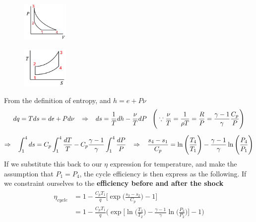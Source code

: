 \documentclass[a4paper,10pt]{article}
\begin{document}
\begin{multicols}{2}
    \begin{figure}[H]
        \centering
        \includegraphics[width=0.2\textwidth]{Figure/PV.png}
    \end{figure}
    \begin{figure}[H]
        \centering
        \includegraphics[width=0.2\textwidth]{Figure/TS.png}
    \end{figure}
\end{multicols}
\vspace*{-0.5cm}
From the definition of entropy, and $h = e+P\nu$
\begin{gather*}
    dq = Tds = de+Pd\nu\hspace*{0.3cm}\Rightarrow\hspace*{0.3cm}ds = \frac{1}{T}dh-\frac{\nu}{T}dP\hspace*{0.3cm}\Bigg(\because\frac{\nu}{T} = \frac{1}{\rho T}=\frac{R}{P} = \frac{\gamma-1}{\gamma}\frac{C_p}{P}\Bigg)\\[0.2cm]
    \Rightarrow\hspace*{0.3cm}\int_{1}^{4}ds = C_p\int_{1}^{4}\frac{dT}{T}-C_p\frac{\gamma -1}{\gamma}\int_{1}^{4}\frac{dP}{P}\hspace*{0.3cm}\Rightarrow\hspace*{0.3cm}\frac{s_4-s_1}{C_p}=\ln\Bigg(\frac{T_4}{T_1}\Bigg)-\frac{\gamma-1}{\gamma}\ln\Bigg(\frac{P_4}{P_1}\Bigg)
\end{gather*}
If we substitute this back to our $\eta$ expression for temperature, and make the assumption that $P_1=P_4$, the cycle efficiency is then express as the following. If we constraint ourselves to the \textbf{efficiency before and after the shock}
\begin{gather*}
    \begin{split}
        \eta_{cycle} &= 1-\frac{C_pT_1}{q}\Bigg[\exp\Bigg(\frac{s_3-s_2}{C_p}\Bigg)-1\Bigg]\\[0.2cm]
        &= 1-\frac{C_pT_1}{q}\Bigg(\exp\Bigg[\ln\Bigg(\frac{T_3}{T_2}\Bigg)-\frac{\gamma-1}{\gamma}\ln\Bigg(\frac{P_3}{P_2}\Bigg)\Bigg]-1\Bigg)
    \end{split}
\end{gather*}
\end{document}
